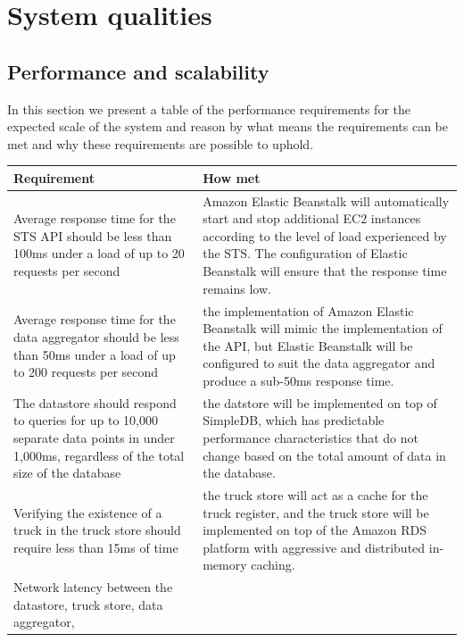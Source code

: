 \documentclass[a4paper,11pt]{report}
\begin{document}
\chapter{System qualities}
\label{cha:system-qualities}
\thispagestyle{fancy}

\section{Performance and scalability}
\label{sec:perf-scal}
In this section we present a table of the performance requirements for the expected scale of the system and reason by what means the requirements can be met and why these requirements are possible to uphold.

\begin{center}
  \begin{longtable}[h!]{| p{} | p{} |}
    \hline
    \rowcolor{gray}
    Requirement & How met \\
    \hline
    \hline
    Average response time for the STS API should be less than 100ms under a
    load of up to 20 requests per second & Amazon Elastic Beanstalk will
    automatically start and stop additional EC2 instances according to the
    level of load experienced by the STS. The configuration of Elastic
    Beanstalk will ensure that the response time remains low. \\
    \hline
    Average response time for the data aggregator should be less than 50ms
    under a load of up to 200 requests per second & the implementation of
    Amazon Elastic Beanstalk will mimic the implementation of the API, but
    Elastic Beanstalk will be configured to suit the data aggregator and
    produce a sub-50ms response time. \\
    \hline
    The datastore should respond to queries for up to 10,000 separate data
    points in under 1,000ms, regardless of the total size of the database & the
    datstore will be implemented on top of SimpleDB, which has predictable
    performance characteristics that do not change based on the total amount of
    data in the database. \\
    \hline
    Verifying the existence of a truck in the truck store should require
    less than 15ms of time & the truck store will act as a cache for the
    truck register, and the truck store will be implemented on top of the
    Amazon RDS platform with aggressive and distributed in-memory caching. \\
    \hline
    Network latency between the datastore, truck store, data aggregator,

\end{longtable}
\end{center}
\end{document}
